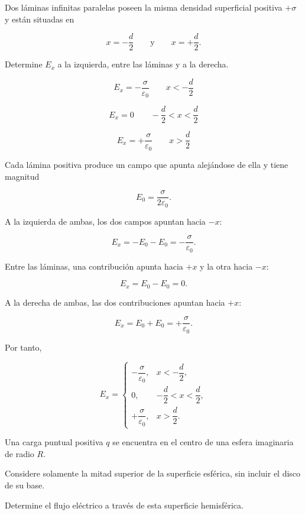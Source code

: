\begin{ejercicio}

Dos láminas infinitas paralelas poseen la misma densidad superficial positiva
\(+\sigma\) y están situadas en

\[
x=-\frac d2
\qquad\text{y}\qquad
x=+\frac d2.
\]

Determine \(E_x\) a la izquierda, entre las láminas y a la derecha.

\end{ejercicio}

\begin{respuesta}

\[
\boxed{
E_x=-\frac{\sigma}{\varepsilon_0}
\qquad x<-\frac d2
}
\]

\[
\boxed{
E_x=0
\qquad
-\frac d2<x<\frac d2
}
\]

\[
\boxed{
E_x=+\frac{\sigma}{\varepsilon_0}
\qquad x>\frac d2
}
\]

\end{respuesta}

\begin{explicacion}

Cada lámina positiva produce un campo que apunta alejándose de ella y tiene magnitud

\[
E_0=\frac{\sigma}{2\varepsilon_0}.
\]

A la izquierda de ambas, los dos campos apuntan hacia \(-x\):

\[
E_x=-E_0-E_0
=-\frac{\sigma}{\varepsilon_0}.
\]

Entre las láminas, una contribución apunta hacia \(+x\) y la otra hacia \(-x\):

\[
E_x=E_0-E_0=0.
\]

A la derecha de ambas, las dos contribuciones apuntan hacia \(+x\):

\[
E_x=E_0+E_0
=+\frac{\sigma}{\varepsilon_0}.
\]

Por tanto,

\[
\boxed{
E_x=
\begin{cases}
-\dfrac{\sigma}{\varepsilon_0},
& x<-\dfrac d2,\\[0.8em]
0,
& -\dfrac d2<x<\dfrac d2,\\[0.8em]
+\dfrac{\sigma}{\varepsilon_0},
& x>\dfrac d2.
\end{cases}
}
\]

\end{explicacion}


\begin{ejercicio}

Una carga puntual positiva \(q\) se encuentra en el centro de una esfera imaginaria
de radio \(R\).

Considere solamente la mitad superior de la superficie esférica, sin incluir el
disco de su base.

Determine el flujo eléctrico a través de esta superficie hemisférica.

\end{ejercicio}

